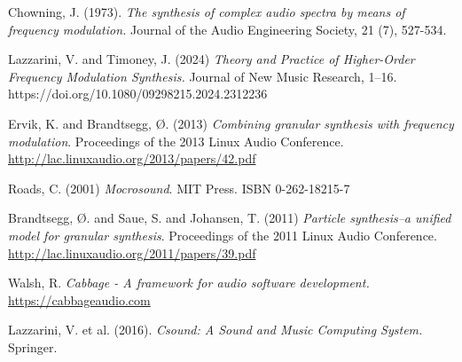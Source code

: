 \documentclass[runningheads,a4paper]{llncs}
\begin{document}
\begin{thebibliography}{99}


 Chowning, J. (1973). \emph{The synthesis of complex audio spectra by means of frequency modulation.} Journal of the Audio Engineering Society, 21 (7), 527-534.
	
 Lazzarini, V. and Timoney, J. (2024) \emph{Theory and Practice of Higher-Order Frequency Modulation Synthesis.} Journal of New Music Research, 1–16. https://doi.org/10.1080/09298215.2024.2312236

 Ervik, K. and Brandtsegg, Ø. (2013) \emph{Combining granular synthesis with frequency modulation}. Proceedings of the 2013 Linux Audio Conference. \url{http://lac.linuxaudio.org/2013/papers/42.pdf}

 Roads, C. (2001) \emph{Mocrosound}. MIT Press.  ISBN 0-262-18215-7

 Brandtsegg, Ø. and Saue, S. and Johansen, T. (2011) \emph{Particle synthesis–a unified model for granular synthesis}. Proceedings of the 2011 Linux Audio Conference. \url{http://lac.linuxaudio.org/2011/papers/39.pdf}

 Walsh, R. \emph{Cabbage - A framework for audio software development.} \url{https://cabbageaudio.com}

 Lazzarini, V. et al. (2016). \emph{Csound: A Sound and Music Computing System.} Springer.



\end{thebibliography}
\end{document}
